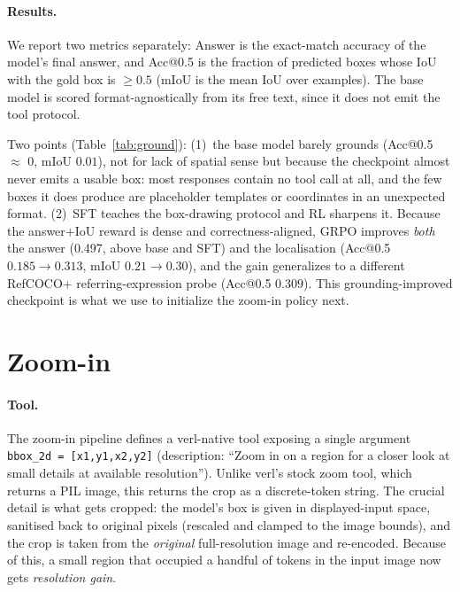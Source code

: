 \documentclass[10pt,twocolumn]{article}
\newcommand{\code}[1]{\texttt{\small #1}}
\begin{document}
\paragraph{Results.} We report two metrics separately: Answer is the
exact-match accuracy of the model's final answer, and Acc@0.5 is the
fraction of predicted boxes whose IoU with the gold box is $\ge\!0.5$ (mIoU
is the mean IoU over examples). The base model is scored format-agnostically from
its free text, since it does not emit the tool protocol.

Two points (Table~\ref{tab:ground}): (1)~the base model barely grounds
(Acc@0.5 $\approx$ 0, mIoU $0.01$), not for lack of spatial sense but because the checkpoint
almost never emits a usable box: most responses contain no tool call at all, and
the few boxes it does produce are placeholder templates or coordinates in an
unexpected format. (2)~SFT teaches the box-drawing protocol and RL sharpens it.
Because the answer$+$IoU reward is dense and correctness-aligned, GRPO improves
\emph{both} the answer (0.497, above base and SFT) and the localisation
(Acc@0.5 $0.185\!\to\!0.313$, mIoU $0.21\!\to\!0.30$), and the gain generalizes to a different RefCOCO+ referring-expression probe (Acc@0.5 $0.309$). This grounding-improved checkpoint is what we use to initialize the zoom-in policy next.

\section*{Zoom-in}
\label{sec:zoom}

\paragraph{Tool.} The zoom-in pipeline defines a verl-native tool exposing a single argument
\code{bbox\_2d = [x1,y1,x2,y2]} (description: ``Zoom in on a region for a
closer look at small details at available resolution''). Unlike verl's stock zoom
tool, which returns a PIL image, this returns the crop as a discrete-token
string. The crucial detail is what gets
cropped: the model's box is given in displayed-input space, sanitised back
to original pixels (rescaled and clamped to the image bounds), and the crop is taken from the \emph{original} full-resolution
image and re-encoded. Because of this, a small
region that occupied a handful of tokens in the input image now gets \emph{resolution gain}.
\end{document}
